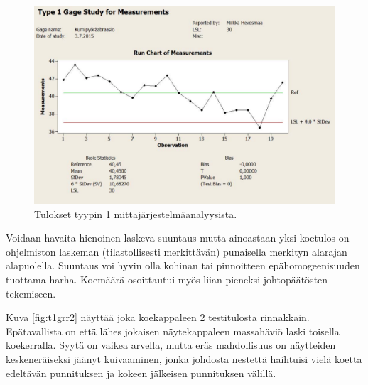 \documentclass[12pt,a4paper,finnish]{tutthesis}
\begin{document}
\begin{figure}
  \begin{center}
    \includegraphics[width=1.0\textwidth]{t1grr}
  \end{center}
  \caption[Tulokset tyypin 1 mittajärjestelmäanalyysista]{Tulokset tyypin 1 mittajärjestelmäanalyysista.}
  \label{fig:t1grr}
\end{figure}

Voidaan havaita hienoinen laskeva suuntaus mutta ainoastaan yksi koetulos on ohjelmiston laskeman (tilastollisesti merkittävän) punaisella merkityn alarajan alapuolella. Suuntaus voi hyvin olla kohinan tai pinnoitteen epähomogeenisuuden tuottama harha.
Koemäärä osoittautui myös liian pieneksi johtopäätösten tekemiseen.

Kuva \ref{fig:t1grr2} näyttää joka koekappaleen 2 testitulosta rinnakkain.
Epätavallista on että lähes jokaisen näytekappaleen massahäviö
laski toisella koekerralla. Syytä on vaikea arvella, mutta eräs
mahdollisuus on näytteiden keskeneräiseksi jäänyt kuivaaminen,
jonka johdosta nestettä haihtuisi vielä koetta edeltävän punnituksen
ja kokeen jälkeisen punnituksen välillä.
\end{document}
